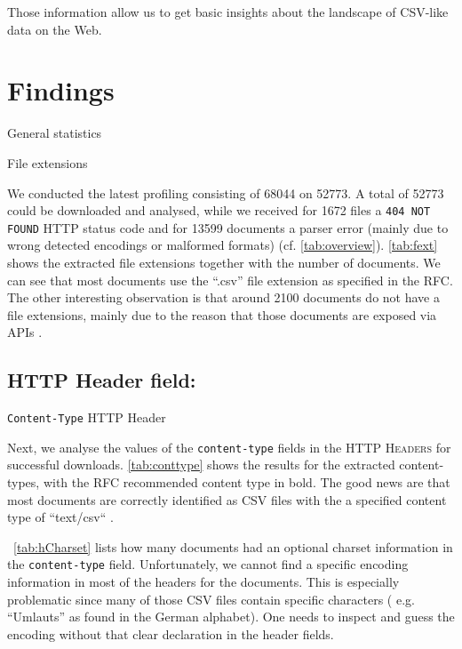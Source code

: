 \documentclass{scrartcl}
\begin{document}
Those information allow us to get basic insights about the landscape of CSV-like data on the Web. 

\section{Findings}
\begin{table}[h]
\centering

\caption{General statistics\label{tab:overview}}
\end{table}

\begin{table}[h]
\centering

\caption{File extensions\label{tab:fext}}
\end{table}
We conducted the latest profiling consisting of 68044 on 52773.
A total of 52773 could be downloaded and analysed, while we received for 1672 files a \texttt{404 NOT FOUND} HTTP status code and for 13599 documents a parser error (mainly due to wrong detected encodings or malformed formats) (cf. \autoref{tab:overview}). \autoref{tab:fext} shows the extracted file extensions together with the number of documents.
We can see that most documents use the ``.csv'' file extension as specified in the RFC. The other interesting observation is that around 2100 documents do not have a file extensions, mainly due to the reason that those documents are exposed via APIs  .


\subsection{HTTP Header field:}
\begin{table}[h]
\centering

\caption{\texttt{Content-Type} \textsc{HTTP} Header\label{tab:conttype}}
\end{table}
Next, we analyse the values of the \texttt{content-type} fields in the \textsc{HTTP Headers} for successful downloads.
\autoref{tab:conttype} shows the results for the extracted content-types, with the RFC recommended content type in bold. 
The good news are that most documents are correctly identified as CSV files with the a specified content type of ``text/csv`` . 

~\autoref{tab:hCharset} lists how many documents had an optional charset information in the \texttt{content-type} field. 
Unfortunately, we cannot find a specific encoding information in most of the headers for the documents. 
This is especially problematic since many of those CSV files contain specific characters ( e.g. ``Umlauts'' as found in the German alphabet). 
One needs to inspect and guess the encoding without that clear declaration in the header fields. 
\end{document}

